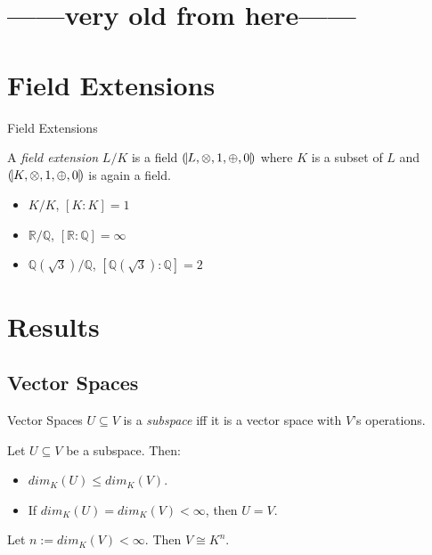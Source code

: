 \documentclass[%
	sans,
	12pt,
]{beamer}
\newcommand{\high}[1]{{\usebeamercolor[fg]{structure} #1}}
\newcommand{\QQ}{\mathbb{Q}}
\newcommand{\RR}{\mathbb{R}}
\begin{document}
\section{------very old from here------}

\section{Field Extensions}
\begin{frame}
\begin{center}
	\huge\high{Field Extensions}
\end{center}
\end{frame}

\begin{frame}

A \emph{field extension} $L/K$ is a field $(\mkern-3mu\mid\mkern-6mu L,\otimes,1,\oplus,0\mkern-6mu\mid\mkern-3mu)$ where $K$ is a subset of $L$ and $(\mkern-3mu\mid\mkern-6mu K,\otimes,1,\oplus,0\mkern-6mu\mid\mkern-3mu)$ is again a field.
\begin{itemize}
\item $K/K$, $[K:K] = 1$\pause
\item $\RR/\QQ$, $[\RR:\QQ]=\infty$\pause
\item $\QQ(\sqrt{3})/\QQ$, $[\QQ(\sqrt{3}):\QQ] = 2$ %
\end{itemize}
\end{frame}

\section{Results} %

\subsection{Vector Spaces}
\begin{frame}{Vector Spaces}\pause
$U \subseteq V$ is a \emph{subspace} iff it is a vector space with $V$'s operations.
\begin{theorem}
\upshape
Let $U \subseteq V$ be a subspace. Then:
\begin{itemize}
	\item $dim_K(U) \le dim_K(V)$.
	\item If $dim_K(U)=dim_K(V) < \infty$, then $U = V$.
\end{itemize} %
\end{theorem}\pause
\begin{theorem}
\upshape
Let $n := dim_K(V) < \infty$. Then $V \cong K^n$.
\end{theorem}
\end{frame}
\end{document}
